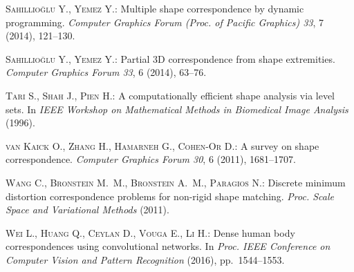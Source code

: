 \documentclass{egpubl}
\begin{document}
\begin{thebibliography}{\uppercase{vKZHCO11}}
\textsc{Sahillio\u{g}lu Y., Yemez Y.}:
\newblock Multiple shape correspondence by dynamic programming.
\newblock \emph{Computer Graphics Forum (Proc. of Pacific Graphics) 33}, 7
  (2014), 121--130.

\textsc{Sahillio\u{g}lu Y., Yemez Y.}:
\newblock Partial {3D} correspondence from shape extremities.
\newblock \emph{Computer Graphics Forum 33}, 6 (2014), 63--76.

\textsc{Tari S., Shah J., Pien H.}:
\newblock A computationally efficient shape analysis via level sets.
\newblock In \emph{IEEE Workshop on Mathematical Methods in Biomedical Image
  Analysis} (1996).

\textsc{van Kaick O., Zhang H., Hamarneh G., Cohen-Or D.}:
\newblock A survey on shape correspondence.
\newblock \emph{Computer Graphics Forum 30}, 6 (2011), 1681--1707.

\textsc{Wang C., Bronstein M.~M., Bronstein A.~M., Paragios N.}:
\newblock Discrete minimum distortion correspondence problems for non-rigid
  shape matching.
\newblock \emph{Proc. Scale Space and Variational Methods} (2011).

\textsc{Wei L., Huang Q., Ceylan D., Vouga E., Li H.}:
\newblock Dense human body correspondences using convolutional networks.
\newblock In \emph{Proc. IEEE Conference on Computer Vision and Pattern
  Recognition} (2016), pp.~1544--1553.

\end{thebibliography}
\end{document}
